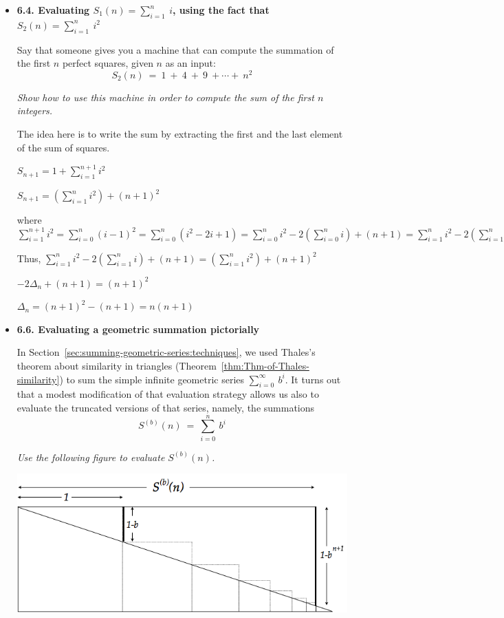 \begin{itemize}
\item
{\bf 6.4. Evaluating $S_1(n) = \sum_{i=1}^n \ i$, using the fact that $S_2(n) = \sum_{i=1}^n \ i^2$}

Say that someone gives you a machine that can compute the summation of the first $n$ perfect squares, given $n$ as an input:
\[ S_2(n)  \ = \ 1 \  + \ 4 \ + \ 9 \ +  \cdots + \ n^2 \]

{\em Show how to use this machine in order to compute the sum of the first $n$ integers.}

\medskip
The idea here is to write the sum by extracting the first and the last element
of the sum of squares.
\medskip

$S_{n+1} = 1 + \sum_{i=1}^{n+1} i^2$

$S_{n+1} = (\sum_{i=1}^{n} i^2) + (n+1)^2$

where $\sum_{i=1}^{n+1} i^2 
= \sum_{i=0}^{n} (i-1)^2 
= \sum_{i=0}^{n} (i^2-2i+1) 
= \sum_{i=0}^{n} i^2- 2 ( \sum_{i=0}^{n} i) + (n+1)
= \sum_{i=1}^{n} i^2- 2 ( \sum_{i=1}^{n} i) + (n+1)$

Thus, 
$\sum_{i=1}^{n} i^2- 2 ( \sum_{i=1}^{n} i) + (n+1) = (\sum_{i=1}^{n} i^2) + (n+1)^2$

$-2 \Delta_n + (n+1) =  (n+1)^2$

$\Delta_n =  (n+1)^2-(n+1) = n(n+1)$
\medskip

\item
{\bf 6.6. Evaluating a geometric summation pictorially}

In Section~\ref{sec:summing-geometric-series:techniques}, we used Thales's theorem about similarity in triangles (Theorem~\ref{thm:Thm-of-Thales-similarity}) to sum the simple infinite geometric series $\sum_{i=0}^\infty \ b^i$.  It turns out that a modest modification of that evaluation strategy allows us also to evaluate the truncated versions of that series, namely, the summations
\[ S^{(b)}(n) \ = \ \sum_{i=0}^n \ b^i \]

{\em Use the following figure to evaluate $S^{(b)}(n)$.}

\centerline{\includegraphics[scale=0.4]{FiguresArithmetic/ThalesGeometricSumFiniteSol}}
\medskip


\end{itemize}
